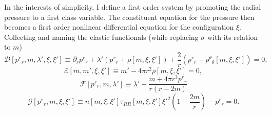 In the interests of simplicity, I define a first order system by promoting the radial pressure to a first class variable. The constituent equation for the pressure then becomes a first order nonlinear differential equation for the configuration $\xi$. Collecting and naming the elastic functionals (while replacing $\sigma$ with its relation to $m$)
\begin{equation}
\mathcal{D}[p^r{}_r,m,\lambda',\xi,\xi'] \equiv \partial_r p^r{}_r + \lambda'
\left( p^r{}_r + \rho[m,\xi,\xi']\right)
+\frac{2}{r}\left(p^r{}_r - p^\theta{}_\theta[m,\xi,\xi']\right) = 0,
\label{eq:functionalhydro}
\end{equation}
\begin{equation}
\mathcal{E}[m,m',\xi,\xi'] \equiv m' - 4\pi r^2\rho[m,\xi,\xi'] = 0,
\label{eq:functionalrr}
\end{equation}
\begin{equation}
\mathcal{F}[p^r{}_r,m,\lambda'] \equiv \lambda' - \frac{m + 4\pi r^3 p^r{}_r}{r(r-2m)}
\label{eq:functionaltt}
\end{equation}
\begin{equation}
\mathcal{G}[p^r{}_r,m,\xi,\xi'] \equiv n[m,\xi,\xi']\tau_{RR}[m,\xi,\xi']\xi'^2\left(1 - \frac{2m}{r}\right) - p^r{}_r = 0.
\label{eq:functionalelastic}
\end{equation}